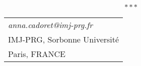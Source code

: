 \documentclass[a4paper, oneside, 12pt]{book}
\begin{document}



 

  $$***$$
 
  \begin{tabular}[t]{l}
\textit{anna.cadoret@imj-prg.fr}\\
 IMJ-PRG, Sorbonne Université\\
 Paris, FRANCE
\end{tabular}

\clearpage
{}
\printindex
\end{document}
